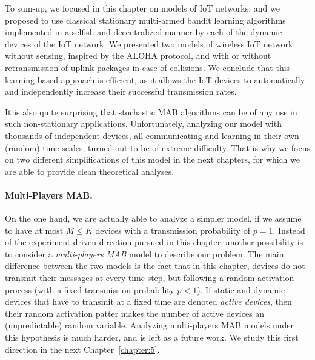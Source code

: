 
To sum-up, we focused in this chapter on models of IoT networks, and we proposed to use classical stationary multi-armed bandit learning algorithms implemented in a selfish and decentralized manner by each of the dynamic devices of the IoT network.
We presented two models of wireless IoT network without sensing, inspired by the ALOHA protocol, and with or without retransmission of uplink packages in case of collisions.
%
We conclude that this learning-based approach is efficient, as it allows the IoT devices to automatically and independently increase their successful transmission rates.

It is also quite surprising that stochastic MAB algorithms can be of any use in such non-stationary applications.
Unfortunately, analyzing our model with thousands of independent devices, all communicating and learning in their own (random) time scales, turned out to be of extreme difficulty.
That is why we focus on two different simplifications of this model in the next chapters, for which we are able to provide clean theoretical analyses.


\paragraph{Multi-Players MAB.}
%
On the one hand, we are actually able to analyze a simpler model, if we assume to have at most $M \leq K$ devices with a transmission probability of $p=1$.
Instead of the experiment-driven direction pursued in this chapter, another possibility is to consider a \emph{multi-players MAB} model to describe our problem.
%
The main difference between the two models is the fact that in this chapter, devices do not transmit their messages at every time step, but following a random activation process (with a fixed transmission probability $p < 1$).
If static and dynamic devices that have to transmit at a fixed time are denoted \emph{active devices},
then their random activation patter makes the number of active devices an (unpredictable) random variable.
Analyzing multi-players MAB models under this hypothesis is much harder, and is left as a future work.
%
We study this first direction in the next Chapter~\ref{chapter:5}.

